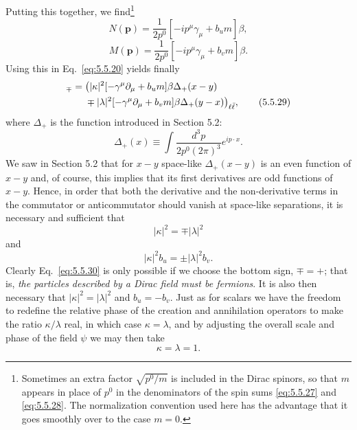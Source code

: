 Putting this together, we find\footnote{Sometimes an extra factor
$\sqrt{p^0/m}$ is included in the Dirac spinors, so that $m$ appears in place
of $p^0$ in the denominators of the spin sums \eqref{eq:5.5.27} and \eqref{eq:5.5.28}. The
normalization convention used here has the advantage that it goes smoothly
over to the case $m=0$.}
\begin{equation}
N(\mathbf p)=\frac1{2p^0}[-ip^\mu\gamma_\mu+b_um]\beta,
\tag{5.5.27}\label{eq:5.5.27}
\end{equation}
\begin{equation}
M(\mathbf p)=\frac1{2p^0}[-ip^\mu\gamma_\mu+b_vm]\beta.
\tag{5.5.28}\label{eq:5.5.28}
\end{equation}
Using this in Eq.~\eqref{eq:5.5.20} yields finally
\begin{align}
[\psi_\ell(x),\psi_{\bar\ell}^\dagger(y)]_\mp
={}&\bigl(|\kappa|^2[-\gamma^\mu\partial_\mu+b_um]\beta\Delta_+(x-y)
\notag\\
&\mp|\lambda|^2[-\gamma^\mu\partial_\mu+b_vm]\beta\Delta_+(y-x)\bigr)_{\ell\bar\ell},
\tag{5.5.29}\label{eq:5.5.29}
\end{align}
where $\Delta_+$ is the function introduced in Section 5.2:
\[
\Delta_+(x)\equiv\int\frac{d^3p}{2p^0(2\pi)^3}e^{ip\cdot x}.
\]
We saw in Section 5.2 that for $x-y$ space-like $\Delta_+(x-y)$ is an even
function of $x-y$ and, of course, this implies that its first derivatives are
odd functions of $x-y$. Hence, in order that both the derivative and the
non-derivative terms in the commutator or anticommutator should vanish at
space-like separations, it is necessary and sufficient that
\begin{equation}
|\kappa|^2=\mp|\lambda|^2
\tag{5.5.30}\label{eq:5.5.30}
\end{equation}
and
\begin{equation}
|\kappa|^2b_u=\pm|\lambda|^2b_v.
\tag{5.5.31}\label{eq:5.5.31}
\end{equation}
Clearly Eq.~\eqref{eq:5.5.30} is only possible if we choose the bottom sign,
$\mp=+$; that is, \emph{the particles described by a Dirac field must be
fermions}. It is also then necessary that $|\kappa|^2=|\lambda|^2$ and
$b_u=-b_v$. Just as for scalars we have the freedom to redefine the relative
phase of the creation and annihilation operators to make the ratio
$\kappa/\lambda$ real, in which case $\kappa=\lambda$, and by adjusting the
overall scale and phase of the field $\psi$ we may then take
\begin{equation}
\kappa=\lambda=1.
\tag{5.5.32}\label{eq:5.5.32}
\end{equation}
